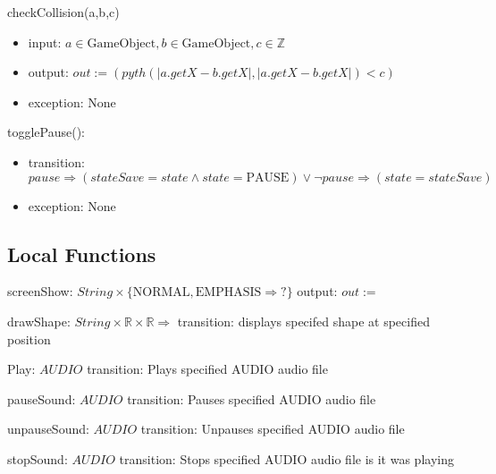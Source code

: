 \documentclass[12pt]{article}
\begin{document}
\noindent checkCollision(a,b,c)
\begin{itemize}
  \item input: $a \in \mbox{GameObject}, b \in \mbox{GameObject}, c \in \mathbb{Z}$
  \item output: $out := (pyth(|a.getX - b.getX|, |a.getX - b.getX|) < c)$
  \item exception: None
\end{itemize}

\noindent togglePause():
\begin{itemize}
    \item transition: $ pause \Rightarrow (stateSave = state \land state = \mbox{PAUSE}) \lor \lnot pause \Rightarrow (state = stateSave) $
    \item exception: None
\end{itemize}

\subsection*{Local Functions}

\noindent screenShow: $String\times\{\mbox{NORMAL},\mbox{EMPHASIS}\Rightarrow?\}$
\noindent output: $out := $

\noindent drawShape: $String\times\mathbb{R}\times\mathbb{R}\Rightarrow$
\noindent transition: displays specifed shape at specified position

\noindent Play: $AUDIO$
\noindent transition: Plays specified AUDIO audio file

\noindent pauseSound: $AUDIO$
\noindent transition: Pauses specified AUDIO audio file

\noindent unpauseSound: $AUDIO$
\noindent transition: Unpauses specified AUDIO audio file

\noindent stopSound: $AUDIO$
\noindent transition: Stops specified AUDIO audio file is it was playing



%
%
%





\end{document}
